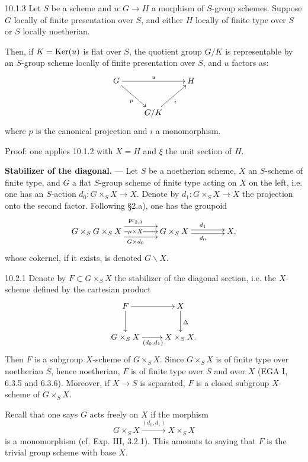 \begin{corollary}{10.1.3}\label{V.10.1.3}
Let $S$ be a scheme and $u:G\to H$ a morphism of $S$-group schemes. Suppose $G$ locally of finite presentation over $S$, and either $H$ locally of finite type over $S$ or $S$ locally noetherian.

Then, if $K=\operatorname{Ker}(u)$ is flat over $S$, the quotient group $G/K$ is representable by an $S$-group scheme locally of finite presentation over $S$, and $u$ factors as:
\[
\xymatrix{G\ar[rr]^u\ar[dr]_p&&H\\&G/K\ar[ur]_i&}
\]
where $p$ is the canonical projection and $i$ a monomorphism.
\end{corollary}
Proof: one applies 10.1.2 with $X=H$ and $\xi$ the unit section of $H$.

\textbf{Stabilizer of the diagonal.} --- Let $S$ be a noetherian scheme, $X$ an $S$-scheme of finite type, and $G$ a flat $S$-group scheme of finite type acting on $X$ on the left, i.e. one has an $S$-action $d_0:G\times_SX\to X$. Denote by $d_1:G\times_SX\to X$ the projection onto the second factor. Following §2.a), one has the groupoid
\[
\xymatrix@C=4em{G\times_SG\times_SX\ar@<1.5ex>[r]^{\mathrm{pr}_{2,3}}\ar[r]|{\mu\times X}\ar@<-1.5ex>[r]_{G\times d_0}&G\times_SX\ar@<.5ex>[r]^{d_1}\ar@<-.5ex>[r]_{d_0}&X,}
\]
whose cokernel, if it exists, is denoted $G\backslash X$.
\begin{definition}{10.2.1}\label{V.10.2.1}
Denote by $F\subset G\times_SX$ the stabilizer of the diagonal section, i.e. the $X$-scheme defined by the cartesian product
\[
\xymatrix{F\ar[r]\ar[d]&X\ar[d]^\Delta\\G\times_SX\ar[r]_{(d_0,d_1)}&X\times_SX.}
\]
Then $F$ is a subgroup $X$-scheme of $G\times_SX$. Since $G\times_SX$ is of finite type over noetherian $S$, hence noetherian, $F$ is of finite type over $S$ and over $X$ (EGA I, 6.3.5 and 6.3.6). Moreover, if $X\to S$ is separated, $F$ is a closed subgroup $X$-scheme of $G\times_SX$.
\end{definition}
Recall that one says $G$ acts freely on $X$ if the morphism
\[
G\times_SX\xrightarrow{(d_0,d_1)}X\times_SX
\]
is a monomorphism (cf. Exp. III, 3.2.1). This amounts to saying that $F$ is the trivial group scheme with base $X$.

